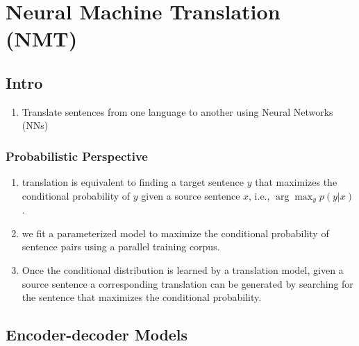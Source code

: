 \chapter{Neural Machine Translation (NMT)}

\section{Intro}

\begin{enumerate}
    \item Translate sentences from one language to another using Neural Networks (NNs)
\end{enumerate}


\subsection{Probabilistic Perspective}

\begin{enumerate}
    \item translation is equivalent to finding a target sentence $y$ that maximizes the conditional probability of $y$ given a source sentence $x$, i.e., $\arg\max_y p(y | x)$.
    \hfill \cite{adv-ml-tech/paper/arxiv.org/1409.0473}

    \item  we fit a parameterized model to maximize the conditional probability of sentence pairs using a parallel training corpus.
    \hfill \cite{adv-ml-tech/paper/arxiv.org/1409.0473}

    \item Once the conditional distribution is learned by a translation model, given a source sentence a corresponding translation can be generated by searching for the sentence that maximizes the conditional probability.
    \hfill \cite{adv-ml-tech/paper/arxiv.org/1409.0473}
\end{enumerate}


















\section{Encoder-decoder Models}

